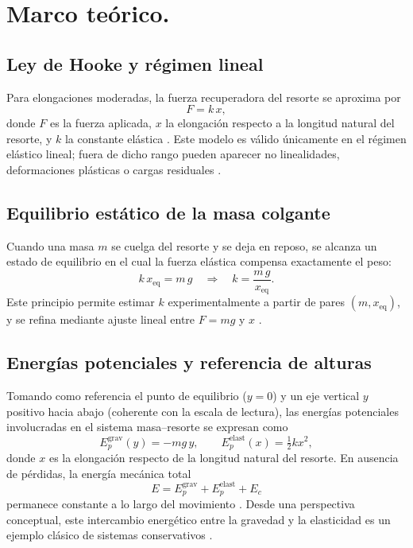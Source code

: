 \documentclass[11pt,twocolumn]{article}
\makeatletter
\let\orig@cite\cite
\renewcommand{\cite}[1]{\textcolor{Blue}{\orig@cite{#1}}}
\let\orig@parencite\parencite
\renewcommand{\parencite}[1]{\textcolor{Blue}{\orig@parencite{#1}}}
\renewcommand{\cite}[1]{\parencite{#1}}      %
\let\orig@cite\cite
\renewcommand{\cite}[1]{\textcolor{Blue}{\orig@cite{#1}}} %
\makeatother
\begin{document}
\section{Marco teórico.}

\subsection{Ley de Hooke y régimen lineal}

Para elongaciones moderadas, la fuerza recuperadora del resorte se aproxima por
\begin{equation*}
    F = k\,x,
\end{equation*}
donde $F$ es la fuerza aplicada, $x$ la elongación respecto a la longitud natural del resorte, y $k$ la constante elástica \cite{SerwayHooke}. Este modelo es válido únicamente en el régimen elástico lineal; fuera de dicho rango pueden aparecer no linealidades, deformaciones plásticas o cargas residuales \cite{HallidayResnick}.

\subsection{Equilibrio estático de la masa colgante}

Cuando una masa $m$ se cuelga del resorte y se deja en reposo, se alcanza un estado de equilibrio en el cual la fuerza elástica compensa exactamente el peso:
\begin{equation*}
    k\,x_{\mathrm{eq}} = m\,g 
\quad \Rightarrow \quad 
k = \frac{m\,g}{x_{\mathrm{eq}}}.
\end{equation*}
Este principio permite estimar $k$ experimentalmente a partir de pares $(m, x_{\mathrm{eq}})$, y se refina mediante ajuste lineal entre $F = mg$ y $x$ \cite{HallidayResnick}.

\subsection{Energías potenciales y referencia de alturas}

Tomando como referencia el punto de equilibrio ($y=0$) y un eje vertical $y$ positivo hacia abajo (coherente con la escala de lectura), las energías potenciales involucradas en el sistema masa–resorte se expresan como
\begin{equation*}
    E_p^{\text{grav}}(y) = -m g\, y,
    \qquad
    E_p^{\text{elast}}(x) = \tfrac{1}{2}k x^2,
\end{equation*}
donde $x$ es la elongación respecto de la longitud natural del resorte. 
En ausencia de pérdidas, la energía mecánica total
\begin{equation*}
    E = E_p^{\text{grav}} + E_p^{\text{elast}} + E_c
\end{equation*}
permanece constante a lo largo del movimiento \cite{TiplerEnergia}. Desde una perspectiva conceptual, este intercambio energético entre la gravedad y la elasticidad es un ejemplo clásico de sistemas conservativos \cite{FeynmanLectures}.
\end{document}

